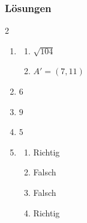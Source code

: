 \subsubsection{Lösungen}
\begin{multicols}{2}
    \begin{enumerate}
        \item \begin{enumerate}
                  \item $\sqrt{104}$
                  \item $A'=(7,11)$
              \end{enumerate}
        \item $6$
        \item $9$
        \item $5$
        \item \begin{enumerate}
                  \item Richtig
                  \item Falsch
                  \item Falsch
                  \item Richtig
              \end{enumerate}
    \end{enumerate}
\end{multicols}